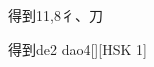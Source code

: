 \begin{entry}{得到}{11,8}{⼻、⼑}
  \begin{phonetics}{得到}{de2 dao4}[][HSK 1]
  \end{phonetics}
\end{entry}
